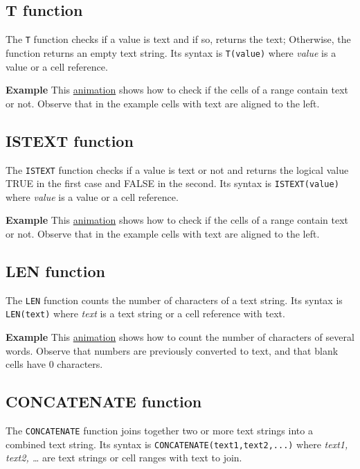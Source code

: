 \subsection{T function}\label{tfunction}
The \texttt{T} function checks if a value is text and if so, returns the text; Otherwise, the function returns an empty text string. Its syntax is \texttt{T(value)} where \emph{value} is a value or a cell reference.

\textbf{Example} This \href{http://aprendeconalf.es/office/excel/manual/img/example_function_t.gif}{animation} shows
how to check if the cells of a range contain text or not. Observe that in the example cells with text are aligned to the left.


\subsection{ISTEXT function}\label{istextfunction}
The \texttt{ISTEXT} function checks if a value is text or not and returns the logical value TRUE in the first case and FALSE in the second. Its syntax is \texttt{ISTEXT(value)} where \emph{value} is a value or a cell reference.

\textbf{Example} This \href{http://aprendeconalf.es/office/excel/manual/img/example_function_istext.gif}{animation}
shows how to check if the cells of a range contain text or not. Observe that in the example cells with text are aligned to the left.


\subsection{LEN function}\label{lenfunction}
The \texttt{LEN} function counts the number of characters of a text string. Its syntax is \texttt{LEN(text)} where \emph{text} is a text string or a cell reference with text.

\textbf{Example} This \href{http://aprendeconalf.es/office/excel/manual/img/example_function_len.gif}{animation} shows
how to count the number of characters of several words. Observe that numbers are previously converted to text, and that blank cells have 0 characters.


\subsection{CONCATENATE function}\label{concatenatefunction}
The \texttt{CONCATENATE} function joins together two or more text strings into a combined text string. Its syntax is \texttt{CONCATENATE(text1,text2,...)} where \emph{text1, text2, {\ldots}} are text strings or cell ranges with text to join.

